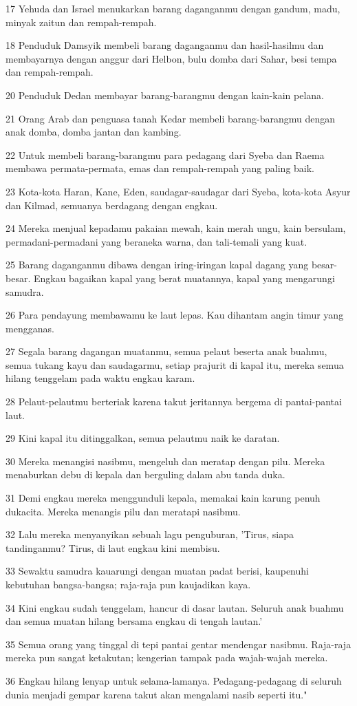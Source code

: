 \par 17 Yehuda dan Israel menukarkan barang daganganmu dengan gandum, madu, minyak zaitun dan rempah-rempah.
\par 18 Penduduk Damsyik membeli barang daganganmu dan hasil-hasilmu dan membayarnya dengan anggur dari Helbon, bulu domba dari Sahar, besi tempa dan rempah-rempah.
\par 20 Penduduk Dedan membayar barang-barangmu dengan kain-kain pelana.
\par 21 Orang Arab dan penguasa tanah Kedar membeli barang-barangmu dengan anak domba, domba jantan dan kambing.
\par 22 Untuk membeli barang-barangmu para pedagang dari Syeba dan Raema membawa permata-permata, emas dan rempah-rempah yang paling baik.
\par 23 Kota-kota Haran, Kane, Eden, saudagar-saudagar dari Syeba, kota-kota Asyur dan Kilmad, semuanya berdagang dengan engkau.
\par 24 Mereka menjual kepadamu pakaian mewah, kain merah ungu, kain bersulam, permadani-permadani yang beraneka warna, dan tali-temali yang kuat.
\par 25 Barang daganganmu dibawa dengan iring-iringan kapal dagang yang besar-besar. Engkau bagaikan kapal yang berat muatannya, kapal yang mengarungi samudra.
\par 26 Para pendayung membawamu ke laut lepas. Kau dihantam angin timur yang mengganas.
\par 27 Segala barang dagangan muatanmu, semua pelaut beserta anak buahmu, semua tukang kayu dan saudagarmu, setiap prajurit di kapal itu, mereka semua hilang tenggelam pada waktu engkau karam.
\par 28 Pelaut-pelautmu berteriak karena takut jeritannya bergema di pantai-pantai laut.
\par 29 Kini kapal itu ditinggalkan, semua pelautmu naik ke daratan.
\par 30 Mereka menangisi nasibmu, mengeluh dan meratap dengan pilu. Mereka menaburkan debu di kepala dan berguling dalam abu tanda duka.
\par 31 Demi engkau mereka menggunduli kepala, memakai kain karung penuh dukacita. Mereka menangis pilu dan meratapi nasibmu.
\par 32 Lalu mereka menyanyikan sebuah lagu penguburan, 'Tirus, siapa tandinganmu? Tirus, di laut engkau kini membisu.
\par 33 Sewaktu samudra kauarungi dengan muatan padat berisi, kaupenuhi kebutuhan bangsa-bangsa; raja-raja pun kaujadikan kaya.
\par 34 Kini engkau sudah tenggelam, hancur di dasar lautan. Seluruh anak buahmu dan semua muatan hilang bersama engkau di tengah lautan.'
\par 35 Semua orang yang tinggal di tepi pantai gentar mendengar nasibmu. Raja-raja mereka pun sangat ketakutan; kengerian tampak pada wajah-wajah mereka.
\par 36 Engkau hilang lenyap untuk selama-lamanya. Pedagang-pedagang di seluruh dunia menjadi gempar karena takut akan mengalami nasib seperti itu."

